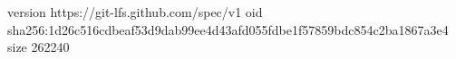 version https://git-lfs.github.com/spec/v1
oid sha256:1d26c516cdbeaf53d9dab99ee4d43afd055fdbe1f57859bdc854c2ba1867a3e4
size 262240
